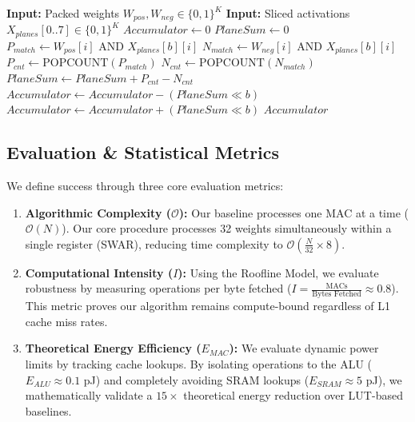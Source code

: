 \documentclass[10pt, conference]{IEEEtran}
\begin{document}
\begin{algorithm}[h]
\caption{Fused Bit-Serial ALU Kernel}\label{alg:popcount}
\begin{algorithmic}[1]
\STATE \textbf{Input:} Packed weights $W_{pos}, W_{neg} \in \{0,1\}^K$
\STATE \textbf{Input:} Sliced activations $X_{planes}[0..7] \in \{0,1\}^K$
\STATE $Accumulator \leftarrow 0$
    \STATE $PlaneSum \leftarrow 0$
        \STATE $P_{match} \leftarrow W_{pos}[i] \text{ AND } X_{planes}[b][i]$
        \STATE $N_{match} \leftarrow W_{neg}[i] \text{ AND } X_{planes}[b][i]$
        \STATE $P_{cnt} \leftarrow \text{POPCOUNT}(P_{match})$
        \STATE $N_{cnt} \leftarrow \text{POPCOUNT}(N_{match})$
        \STATE $PlaneSum \leftarrow PlaneSum + P_{cnt} - N_{cnt}$
    \ENDFOR
        \STATE $Accumulator \leftarrow Accumulator - (PlaneSum \ll b)$
    \ELSE
        \STATE $Accumulator \leftarrow Accumulator + (PlaneSum \ll b)$
    \ENDIF
\ENDFOR
\RETURN $Accumulator$
\end{algorithmic}
\end{algorithm}

\subsection{Evaluation \& Statistical Metrics}
We define success through three core evaluation metrics:
\begin{enumerate}
    \item \textbf{Algorithmic Complexity ($\mathcal{O}$):} Our baseline processes one MAC at a time ($\mathcal{O}(N)$). Our core procedure processes 32 weights simultaneously within a single register (SWAR), reducing time complexity to $\mathcal{O}(\frac{N}{32} \times 8)$.
    \item \textbf{Computational Intensity ($I$):} Using the Roofline Model, we evaluate robustness by measuring operations per byte fetched ($I = \frac{\text{MACs}}{\text{Bytes Fetched}} \approx 0.8$). This metric proves our algorithm remains compute-bound regardless of L1 cache miss rates.
    \item \textbf{Theoretical Energy Efficiency ($E_{MAC}$):} We evaluate dynamic power limits by tracking cache lookups. By isolating operations to the ALU ($E_{ALU} \approx 0.1$ pJ) and completely avoiding SRAM lookups ($E_{SRAM} \approx 5$ pJ), we mathematically validate a $15\times$ theoretical energy reduction over LUT-based baselines.
\end{enumerate}
\end{document}
